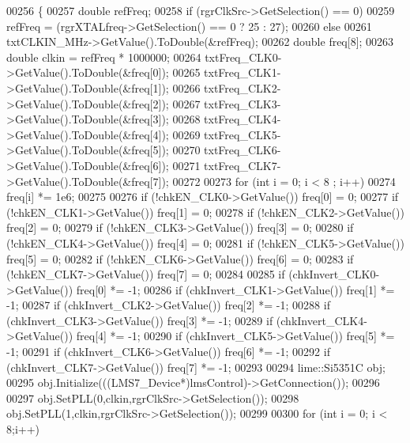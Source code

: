 \begin{DoxyCode}
00256 \{
00257     \textcolor{keywordtype}{double} refFreq;
00258     \textcolor{keywordflow}{if} (rgrClkSrc->GetSelection() == 0)
00259         refFreq = (rgrXTALfreq->GetSelection() == 0 ? 25 : 27);
00260     \textcolor{keywordflow}{else}
00261         txtCLKIN\_MHz->GetValue().ToDouble(&refFreq);
00262     \textcolor{keywordtype}{double} freq[8];
00263     \textcolor{keywordtype}{double} clkin = refFreq * 1000000;
00264     txtFreq\_CLK0->GetValue().ToDouble(&freq[0]);
00265     txtFreq\_CLK1->GetValue().ToDouble(&freq[1]);
00266     txtFreq\_CLK2->GetValue().ToDouble(&freq[2]);
00267     txtFreq\_CLK3->GetValue().ToDouble(&freq[3]);
00268     txtFreq\_CLK4->GetValue().ToDouble(&freq[4]);
00269     txtFreq\_CLK5->GetValue().ToDouble(&freq[5]);
00270     txtFreq\_CLK6->GetValue().ToDouble(&freq[6]);
00271     txtFreq\_CLK7->GetValue().ToDouble(&freq[7]);
00272 
00273     \textcolor{keywordflow}{for} (\textcolor{keywordtype}{int} i = 0; i < 8 ; i++)
00274         freq[i] *= 1e6;
00275 
00276     \textcolor{keywordflow}{if} (!chkEN\_CLK0->GetValue()) freq[0]  = 0;
00277     \textcolor{keywordflow}{if} (!chkEN\_CLK1->GetValue()) freq[1]  = 0;
00278     \textcolor{keywordflow}{if} (!chkEN\_CLK2->GetValue()) freq[2]  = 0;
00279     \textcolor{keywordflow}{if} (!chkEN\_CLK3->GetValue()) freq[3]  = 0;
00280     \textcolor{keywordflow}{if} (!chkEN\_CLK4->GetValue()) freq[4]  = 0;
00281     \textcolor{keywordflow}{if} (!chkEN\_CLK5->GetValue()) freq[5]  = 0;
00282     \textcolor{keywordflow}{if} (!chkEN\_CLK6->GetValue()) freq[6]  = 0;
00283     \textcolor{keywordflow}{if} (!chkEN\_CLK7->GetValue()) freq[7]  = 0;
00284 
00285     \textcolor{keywordflow}{if} (chkInvert\_CLK0->GetValue()) freq[0] *= -1;
00286     \textcolor{keywordflow}{if} (chkInvert\_CLK1->GetValue()) freq[1] *= -1;
00287     \textcolor{keywordflow}{if} (chkInvert\_CLK2->GetValue()) freq[2] *= -1;
00288     \textcolor{keywordflow}{if} (chkInvert\_CLK3->GetValue()) freq[3] *= -1;
00289     \textcolor{keywordflow}{if} (chkInvert\_CLK4->GetValue()) freq[4] *= -1;
00290     \textcolor{keywordflow}{if} (chkInvert\_CLK5->GetValue()) freq[5] *= -1;
00291     \textcolor{keywordflow}{if} (chkInvert\_CLK6->GetValue()) freq[6] *= -1;
00292     \textcolor{keywordflow}{if} (chkInvert\_CLK7->GetValue()) freq[7] *= -1;
00293 
00294     lime::Si5351C obj;
00295     obj.Initialize(((LMS7_Device*)lmsControl)->GetConnection());
00296 
00297     obj.SetPLL(0,clkin,rgrClkSrc->GetSelection());
00298     obj.SetPLL(1,clkin,rgrClkSrc->GetSelection());
00299 
00300     \textcolor{keywordflow}{for} (\textcolor{keywordtype}{int} i = 0; i < 8;i++)

\end{DoxyCode}
